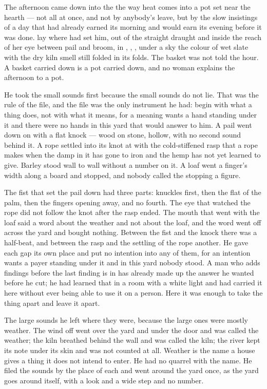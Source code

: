 The afternoon came down into the  the way heat comes into a pot set near the hearth --- not all at once, and not by anybody's leave, but by the slow insistings of a day that had already earned its morning and would earn its evening before it was done.  lay where  had set him, out of the straight draught and inside the reach of her eye between pail and broom, in , , , under a sky the colour of wet slate with the dry kiln smell still folded in its folds. The basket was not told the hour. A basket carried down is a pot carried down, and no woman explains the afternoon to a pot.

He took the small sounds first because the small sounds do not lie. That was the rule of the file, and the file was the only instrument he had: begin with what a thing does, not with what it means, for a meaning wants a hand standing under it and there were no hands in this yard that would answer to him. A pail went down on  with a flat knock --- wood on stone, hollow, with no second sound behind it. A rope settled into its knot at  with the cold-stiffened rasp that a rope makes when the damp in it has gone to iron and the hemp has not yet learned to give. Barley stood wall to wall without a number on it. A loaf went a finger's width along a board and stopped, and nobody called the stopping a figure.

The fist that set the pail down had three parts: knuckles first, then the flat of the palm, then the fingers opening away, and no fourth. The eye that watched the rope did not follow the knot after the rasp ended. The mouth that went with the loaf said a word about the weather and not about the loaf, and the word went off across the yard and bought nothing. Between the fist and the knock there was a half-beat, and between the rasp and the settling of the rope another. He gave each gap its own place and put no intention into any of them, for an intention wants a payer standing under it and in this yard nobody stood. A man who adds findings before the last finding is in has already made up the answer he wanted before he cut; he had learned that in a room with a white light and had carried it here without ever being able to use it on a person. Here it was enough to take the thing apart and leave it apart.

The large sounds he left where they were, because the large ones were mostly weather. The wind off  went over the yard and under the door and was called the weather; the kiln breathed behind the wall and was called the kiln; the river kept its note under its skin and was not counted at all. Weather is the name a house gives a thing it does not intend to enter. He had no quarrel with the name. He filed the sounds by the place of each and went around the yard once, as the yard goes around itself, with a look and a wide step and no number.

